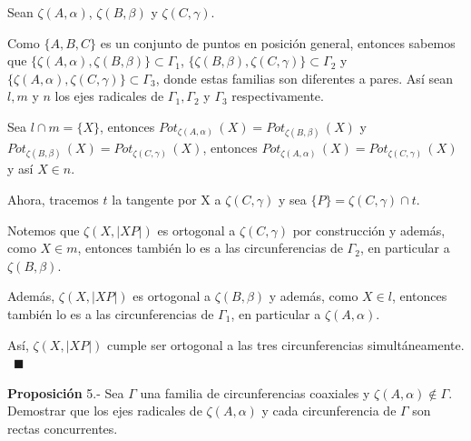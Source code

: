 \documentclass[12pt]{beamer}
\theoremstyle{definition}
\newenvironment{prop}{\begin{block}{\textbf{Proposición}}}{\end{block}}
\begin{document}
\begin{frame}
Sean $\zeta(A,\alpha)$, $\zeta(B,\beta)$ y $\zeta(C,\gamma)$.

\vspace{0.3cm}

Como $\{A,B,C\}$ es un conjunto de puntos en posición general, entonces sabemos que $\{ \zeta(A,\alpha), \zeta(B,\beta) \} \subset \Gamma_{1}$, $\{ \zeta(B,\beta), \zeta(C,\gamma) \} \subset \Gamma_{2}$ y $\{ \zeta(A,\alpha), \zeta(C,\gamma) \} \subset \Gamma_{3}$, donde estas familias son diferentes a pares. Así sean $l, m$ y $n$ los ejes radicales de $\Gamma_{1}, \Gamma_{2}$ y $\Gamma_{3}$ respectivamente. 

\vspace{0.3cm}

Sea $l \cap m = \{ X \}$, entonces $Pot_{\zeta(A, \alpha)} \, (X) = Pot_{\zeta(B, \beta)} \, (X)$ y $Pot_{\zeta(B, \beta)} \, (X) = Pot_{\zeta(C, \gamma)} \, (X)$, entonces $Pot_{\zeta(A, \alpha)} \, (X) = Pot_{\zeta(C, \gamma)} \, (X)$ y así $X \in n$.
\end{frame}


\begin{frame}
Ahora, tracemos $t$ la tangente por X a $\zeta(C, \gamma)$ y sea $\{ P \} = \zeta(C, \gamma) \cap t$.

\vspace{0.3cm}

Notemos que $\zeta(X, |XP|)$ es ortogonal a $\zeta(C, \gamma)$ por construcción y además, como $X \in m$, entonces también lo es a las circunferencias de $\Gamma_{2}$, en particular a $\zeta(B, \beta)$.

\vspace{0.3cm}

Además, $\zeta(X, |XP|)$ es ortogonal a $\zeta(B, \beta)$ y además, como $X \in l$, entonces también lo es a las circunferencias de $\Gamma_{1}$, en particular a $\zeta(A, \alpha)$.

\vspace{0.3cm}

Así, $\zeta(X, |XP|)$ cumple ser ortogonal a las tres circunferencias simultáneamente. \, $\blacksquare$
\end{frame}


\begin{frame}
\begin{prop}
5.- Sea $\Gamma$ una familia de circunferencias coaxiales y $\zeta(A, \alpha) \notin \Gamma$. Demostrar que los ejes radicales de $\zeta (A, \alpha)$ y cada circunferencia de $\Gamma$ son rectas concurrentes.
\end{prop}
\end{frame}
\end{document}
